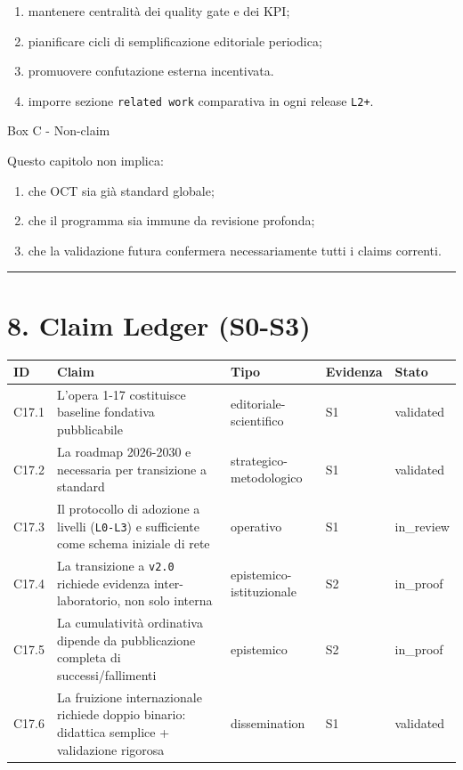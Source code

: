 \begin{enumerate}
\def\labelenumi{\arabic{enumi}.}
\tightlist
\item
  mantenere centralità dei quality gate e dei KPI;
\item
  pianificare cicli di semplificazione editoriale periodica;
\item
  promuovere confutazione esterna incentivata.
\item
  imporre sezione \texttt{related\ work} comparativa in ogni release \texttt{L2+}.
\end{enumerate}

Box C - Non-claim

Questo capitolo non implica:

\begin{enumerate}
\def\labelenumi{\arabic{enumi}.}
\tightlist
\item
  che OCT sia già standard globale;
\item
  che il programma sia immune da revisione profonda;
\item
  che la validazione futura confermera necessariamente tutti i claims correnti.
\end{enumerate}

\begin{center}\rule{0.5\linewidth}{0.5pt}\end{center}

\section{8. Claim Ledger (S0-S3)}

{\def\LTcaptype{none} %
\begin{longtable}[]{@{}lllll@{}}
\toprule\noalign{}
ID & Claim & Tipo & Evidenza & Stato \\
\midrule\noalign{}
\endhead
\bottomrule\noalign{}
\endlastfoot
C17.1 & L'opera 1-17 costituisce baseline fondativa pubblicabile & editoriale-scientifico & S1 & validated \\
C17.2 & La roadmap 2026-2030 e necessaria per transizione a standard & strategico-metodologico & S1 & validated \\
C17.3 & Il protocollo di adozione a livelli (\texttt{L0-L3}) e sufficiente come schema iniziale di rete & operativo & S1 & in\_review \\
C17.4 & La transizione a \texttt{v2.0} richiede evidenza inter-laboratorio, non solo interna & epistemico-istituzionale & S2 & in\_proof \\
C17.5 & La cumulatività ordinativa dipende da pubblicazione completa di successi/fallimenti & epistemico & S2 & in\_proof \\
C17.6 & La fruizione internazionale richiede doppio binario: didattica semplice + validazione rigorosa & dissemination & S1 & validated \\
\end{longtable}
}

